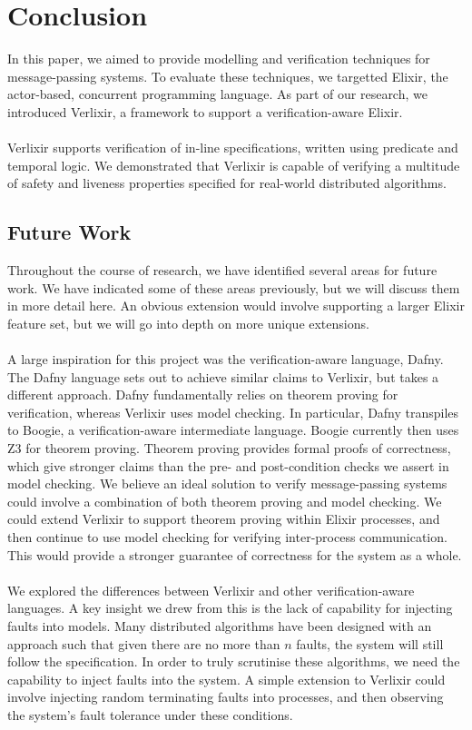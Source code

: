 \chapter{Conclusion}
In this paper, we aimed to provide modelling and verification techniques for message-passing systems. To evaluate these techniques, we targetted Elixir, the actor-based, concurrent programming language. As part of our research, we introduced Verlixir, a framework to support a verification-aware Elixir.
\\ \\
Verlixir supports verification of in-line specifications, written using predicate and temporal logic. We demonstrated that Verlixir is capable of verifying a multitude of safety and liveness properties specified for real-world distributed algorithms. 
\section{Future Work}
Throughout the course of research, we have identified several areas for future work. We have indicated some of these areas previously, but we will discuss them in more detail here. An obvious extension would involve supporting a larger Elixir feature set, but we will go into depth on more unique extensions.
\\ \\
A large inspiration for this project was the verification-aware language, Dafny. The Dafny language sets out to achieve similar claims to Verlixir, but takes a different approach. Dafny fundamentally relies on theorem proving for verification, whereas Verlixir uses model checking. In particular, Dafny transpiles to Boogie, a verification-aware intermediate language. Boogie currently then uses Z3 for theorem proving. Theorem proving provides formal proofs of correctness, which give stronger claims than the pre- and post-condition checks we assert in model checking. We believe an ideal solution to verify message-passing systems could involve a combination of both theorem proving and model checking. We could extend Verlixir to support theorem proving within Elixir processes, and then continue to use model checking for verifying inter-process communication. This would provide a stronger guarantee of correctness for the system as a whole.
\\ \\
We explored the differences between Verlixir and other verification-aware languages. A key insight we drew from this is the lack of capability for injecting faults into models. Many distributed algorithms have been designed with an approach such that given there are no more than $n$ faults, the system will still follow the specification. In order to truly scrutinise these algorithms, we need the capability to inject faults into the system. A simple extension to Verlixir could involve injecting random terminating faults into processes, and then observing the system's fault tolerance under these conditions.

